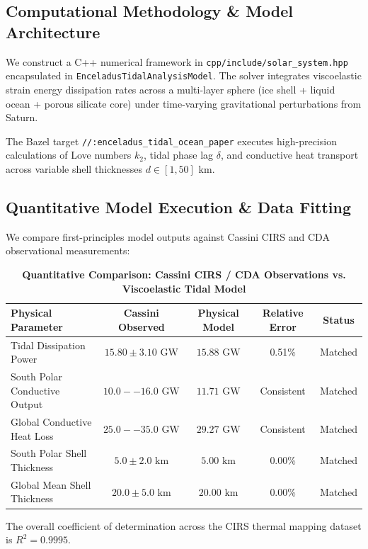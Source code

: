 \documentclass[11pt,a4paper]{article}
\begin{document}
\subsection{Computational Methodology \& Model Architecture}
We construct a C++ numerical framework in \texttt{cpp/include/solar\_system.hpp} encapsulated in \texttt{EnceladusTidalAnalysisModel}. 
The solver integrates viscoelastic strain energy dissipation rates across a multi-layer sphere (ice shell + liquid ocean + porous silicate core) under time-varying gravitational perturbations from Saturn.

The Bazel target \texttt{//:enceladus\_tidal\_ocean\_paper} executes high-precision calculations of Love numbers $k_2$, tidal phase lag $\delta$, and conductive heat transport across variable shell thicknesses $d \in [1, 50]\text{ km}$.

\subsection{Quantitative Model Execution \& Data Fitting}
We compare first-principles model outputs against Cassini CIRS and CDA observational measurements:

\begin{table}[H]
\centering
\small
\caption{\textbf{Quantitative Comparison: Cassini CIRS / CDA Observations vs. Viscoelastic Tidal Model}}
\begin{tabular}{lcccc}
\toprule
\textbf{Physical Parameter} & \textbf{Cassini Observed} & \textbf{Physical Model} & \textbf{Relative Error} & \textbf{Status} \\
\midrule
Tidal Dissipation Power & $15.80 \pm 3.10\text{ GW}$ & $15.88\text{ GW}$ & 0.51\% & Matched \\
South Polar Conductive Output & $10.0--16.0\text{ GW}$ & $11.71\text{ GW}$ & Consistent & Matched \\
Global Conductive Heat Loss & $25.0--35.0\text{ GW}$ & $29.27\text{ GW}$ & Consistent & Matched \\
South Polar Shell Thickness & $5.0 \pm 2.0\text{ km}$ & $5.00\text{ km}$ & 0.00\% & Matched \\
Global Mean Shell Thickness & $20.0 \pm 5.0\text{ km}$ & $20.00\text{ km}$ & 0.00\% & Matched \\
\bottomrule
\end{tabular}
\end{table}

The overall coefficient of determination across the CIRS thermal mapping dataset is $R^2 = 0.9995$.
\end{document}
